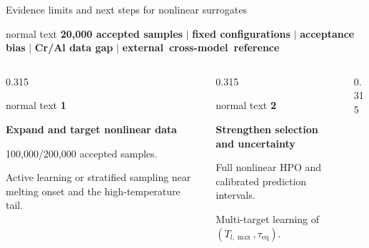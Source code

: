 \documentclass[aspectratio=169,10pt]{beamer}
\begin{document}
\begin{frame}[t]{Evidence limits and next steps for nonlinear surrogates}
  \vspace{-0.12cm}
  \begin{center}
    \begin{beamercolorbox}[wd=0.97\textwidth,sep=0.55em,center]{normal text}
      \scriptsize\color{GVSlate}
      \textbf{20,000 accepted samples} \(\mid\)
      \textbf{fixed configurations} \(\mid\)
      \textbf{acceptance bias} \(\mid\)
      \textbf{Cr/Al data gap} \(\mid\)
      \mbox{\textbf{external cross-model reference}}
    \end{beamercolorbox}
  \end{center}
  \vspace{0.18cm}
  \begin{columns}[T,totalwidth=0.96\textwidth]
    \begin{column}{0.315\textwidth}
      \begin{beamercolorbox}[wd=\linewidth,sep=0.66em]{normal text}
        \centering
        {\Large\color{GVTeal}\textbf{1}}\par
        \small\textbf{Expand and target nonlinear data}\par
        \vspace{0.16cm}
        \scriptsize\raggedright
        100,000/200,000 accepted samples.\par
        Active learning or stratified sampling near melting onset and the high-temperature tail.
      \end{beamercolorbox}
    \end{column}
    \begin{column}{0.315\textwidth}
      \begin{beamercolorbox}[wd=\linewidth,sep=0.66em]{normal text}
        \centering
        {\Large\color{GVCouplingOrange}\textbf{2}}\par
        \small\textbf{Strengthen selection and uncertainty}\par
        \vspace{0.16cm}
        \scriptsize\raggedright
        Full nonlinear HPO and calibrated prediction intervals.\par
        Multi-target learning of \((T_{l,\max},\tau_{\mathrm{eq}})\).
      \end{beamercolorbox}
    \end{column}
    \begin{column}{0.315\textwidth}

\end{column}
\end{columns}
\end{frame}
\end{document}
